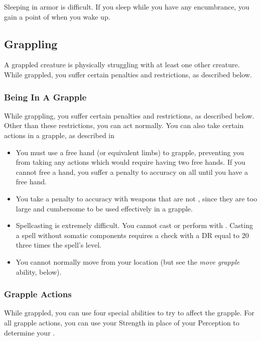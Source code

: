         Sleeping in armor is difficult.
        If you sleep while you have any encumbrance, you gain a point of  when you wake up.

    \subsection{Grappling}\label{Grappling}
        A grappled creature is physically struggling with at least one other creature.
        While grappled, you suffer certain penalties and restrictions, as described below.

        \subsubsection{Being In A Grapple}
            While grappling, you suffer certain penalties and restrictions, as described below. Other than these restrictions, you can act normally. You can also take certain actions in a grapple, as described in 
            \begin{itemize}
                \item You must use a free hand (or equivalent limbs) to grapple, preventing you from taking any actions which would require having two free hands.
                    If you cannot free a hand, you suffer a  penalty to accuracy on all  until you have a free hand.
                \item You take a  penalty to accuracy with weapons that are not , since they are too large and cumbersome to be used effectively in a grapple.
                \item Spellcasting is extremely difficult. You cannot cast  or perform  with .
                    Casting a spell without somatic components requires a  check with a DR equal to 20 \add three times the spell's level.
                \item You cannot normally move from your location (but see the \textit{move grapple} ability, below).
            \end{itemize}

        \subsubsection{Grapple Actions}\label{Grapple Actions}
            While grappled, you can use four special abilities to try to affect the grapple.
            For all grapple actions, you can use your Strength in place of your Perception to determine your .

